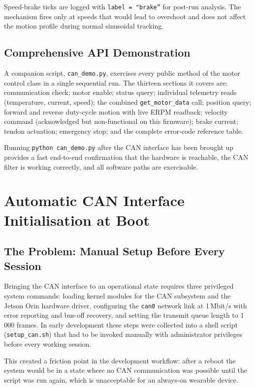 \documentclass[12pt,a4paper]{article}
\begin{document}
Speed-brake ticks are logged with \texttt{label = "brake''} for
post-run analysis.  The mechanism fires only at speeds that would lead
to overshoot and does not affect the motion profile during normal
sinusoidal tracking.

\subsection{Comprehensive API Demonstration}

A companion script, \texttt{can\_demo.py}, exercises every public method of
the motor control class in a single sequential run.  The thirteen sections
it covers are: communication check; motor enable; status query; individual
telemetry reads (temperature, current, speed); the combined
\texttt{get\_motor\_data} call; position query; forward and reverse
duty-cycle motion with live ERPM readback; velocity command (acknowledged
but non-functional on this firmware); brake current; tendon actuation;
emergency stop; and the complete error-code reference table.

Running \texttt{python can\_demo.py} after the CAN interface has been
brought up provides a fast end-to-end confirmation that the hardware is
reachable, the CAN filter is working correctly, and all software paths are
exercisable.
\section{Automatic CAN Interface Initialisation at Boot}
\label{sec:service}

\subsection{The Problem: Manual Setup Before Every Session}

Bringing the CAN interface to an operational state requires three privileged
system commands: loading kernel modules for the CAN subsystem and the
Jetson Orin hardware driver, configuring the \texttt{can0} network link at
1\,Mbit/s with error reporting and bus-off recovery, and setting the
transmit queue length to 1\,000 frames.  In early development these steps
were collected into a shell script (\texttt{setup\_can.sh}) that had to be
invoked manually with administrator privileges before every working session.

This created a friction point in the development workflow: after a reboot
the system would be in a state where no CAN communication was possible
until the script was run again, which is unacceptable for an always-on
wearable device.
\end{document}

